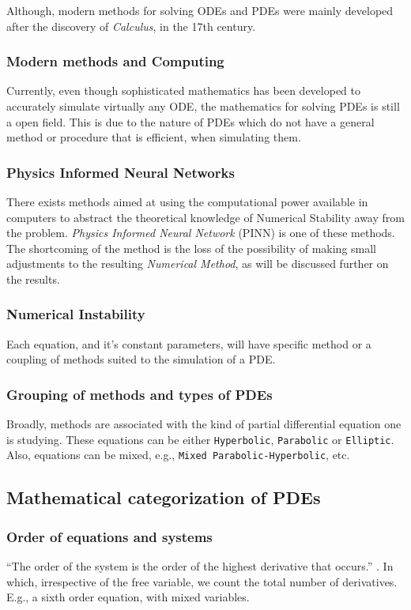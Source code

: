 \documentclass[12pt]{article}
\begin{document}
Although, modern methods for solving ODEs and PDEs were mainly
developed after the discovery of \emph{Calculus}, in the 17th century.

\subsubsection{Modern methods and Computing}
\label{sec:orgfd71f3e}
Currently, even though sophisticated mathematics has been
developed to accurately simulate virtually any ODE, the mathematics
for solving PDEs is still a open field. This is due to the nature of
PDEs which do not have a general method or procedure that is
efficient, when simulating them.

\subsubsection{Physics Informed Neural Networks}
\label{sec:org420448b}
There exists methods aimed at using the computational power available in computers
to abstract the theoretical knowledge of Numerical Stability away from
the problem. \emph{Physics Informed Neural Network}
(PINN) is one of these methods. The shortcoming of the method is the loss of the
possibility of making small adjustments to the resulting \emph{Numerical
Method}, as will be discussed further on the results.

\subsubsection{Numerical Instability}
\label{sec:org323599d}
Each equation, and it's constant parameters, will have specific method
or a coupling of methods suited to the simulation of a PDE.

\subsubsection{Grouping of methods and types of PDEs}
\label{sec:org601ed5d}
Broadly, methods are associated with the kind of partial differential
equation one is studying. These equations can be either \texttt{Hyperbolic},
\texttt{Parabolic} or \texttt{Elliptic}. Also, equations can be mixed, e.g., \texttt{Mixed
Parabolic-Hyperbolic}, etc.

\subsection{Mathematical categorization of PDEs}
\label{sec:org555a840}
\subsubsection{Order of equations and systems}
\label{sec:orgffa886a}
``The order of the system is the order of the highest derivative that occurs.''
\cite{john1978partial}. In which, irrespective of the free variable, we count the
total number of derivatives. E.g., a sixth order equation, with mixed variables.
\end{document}
